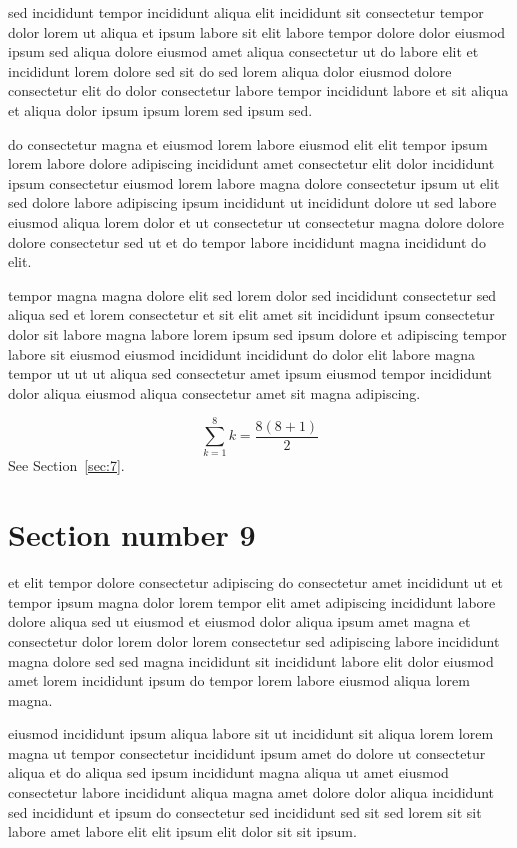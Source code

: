\documentclass{article}
\begin{document}
sed incididunt tempor incididunt aliqua elit incididunt sit consectetur tempor dolor lorem ut aliqua et ipsum labore sit elit labore tempor dolore dolor eiusmod ipsum sed aliqua dolore eiusmod amet aliqua consectetur ut do labore elit et incididunt lorem dolore sed sit do sed lorem aliqua dolor eiusmod dolore consectetur elit do dolor consectetur labore tempor incididunt labore et sit aliqua et aliqua dolor ipsum ipsum lorem sed ipsum sed.

do consectetur magna et eiusmod lorem labore eiusmod elit elit tempor ipsum lorem labore dolore adipiscing incididunt amet consectetur elit dolor incididunt ipsum consectetur eiusmod lorem labore magna dolore consectetur ipsum ut elit sed dolore labore adipiscing ipsum incididunt ut incididunt dolore ut sed labore eiusmod aliqua lorem dolor et ut consectetur ut consectetur magna dolore dolore dolore consectetur sed ut et do tempor labore incididunt magna incididunt do elit.

tempor magna magna dolore elit sed lorem dolor sed incididunt consectetur sed aliqua sed et lorem consectetur et sit elit amet sit incididunt ipsum consectetur dolor sit labore magna labore lorem ipsum sed ipsum dolore et adipiscing tempor labore sit eiusmod eiusmod incididunt incididunt do dolor elit labore magna tempor ut ut ut aliqua sed consectetur amet ipsum eiusmod tempor incididunt dolor aliqua eiusmod aliqua consectetur amet sit magna adipiscing.

\begin{equation} \sum_{k=1}^{8} k = \frac{8(8+1)}{2} \end{equation}
See Section~\ref{sec:7}.

\section{Section number 9}\label{sec:9}
et elit tempor dolore consectetur adipiscing do consectetur amet incididunt ut et tempor ipsum magna dolor lorem tempor elit amet adipiscing incididunt labore dolore aliqua sed ut eiusmod et eiusmod dolor aliqua ipsum amet magna et consectetur dolor lorem dolor lorem consectetur sed adipiscing labore incididunt magna dolore sed sed magna incididunt sit incididunt labore elit dolor eiusmod amet lorem incididunt ipsum do tempor lorem labore eiusmod aliqua lorem magna.

eiusmod incididunt ipsum aliqua labore sit ut incididunt sit aliqua lorem lorem magna ut tempor consectetur incididunt ipsum amet do dolore ut consectetur aliqua et do aliqua sed ipsum incididunt magna aliqua ut amet eiusmod consectetur labore incididunt aliqua magna amet dolore dolor aliqua incididunt sed incididunt et ipsum do consectetur sed incididunt sed sit sed lorem sit sit labore amet labore elit elit ipsum elit dolor sit sit ipsum.
\end{document}
